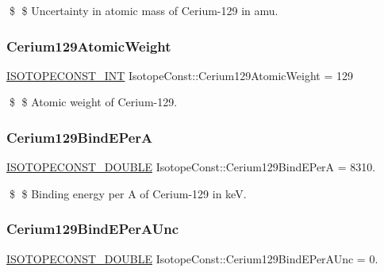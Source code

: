 \$ \$ Uncertainty in atomic mass of Cerium-\/129 in amu. \mbox{\label{group___isotope_const-_cerium-_ce129_ga8aa462ec2c97b78303dde9a27692f708}} 
\subsubsection{\texorpdfstring{Cerium129\+Atomic\+Weight}{Cerium129AtomicWeight}}
{\footnotesize\ttfamily \mbox{\hyperlink{group___isotope_const-_macros_ga5f18360b3e99483a35c32d789e62621c}{I\+S\+O\+T\+O\+P\+E\+C\+O\+N\+S\+T\+\_\+\+I\+NT}} Isotope\+Const\+::\+Cerium129\+Atomic\+Weight = 129}

\$ \$ Atomic weight of Cerium-\/129. \mbox{\label{group___isotope_const-_cerium-_ce129_ga03da9232ce08668b4e27d990b9cae39d}} 
\subsubsection{\texorpdfstring{Cerium129\+Bind\+E\+PerA}{Cerium129BindEPerA}}
{\footnotesize\ttfamily \mbox{\hyperlink{group___isotope_const-_macros_ga8f45a7272ce02c0b4c65c44636ed719a}{I\+S\+O\+T\+O\+P\+E\+C\+O\+N\+S\+T\+\_\+\+D\+O\+U\+B\+LE}} Isotope\+Const\+::\+Cerium129\+Bind\+E\+PerA = 8310.}

\$ \$ Binding energy per A of Cerium-\/129 in keV. \mbox{\label{group___isotope_const-_cerium-_ce129_gad65ee14b4a590990c210962ada8b0fa1}} 
\subsubsection{\texorpdfstring{Cerium129\+Bind\+E\+Per\+A\+Unc}{Cerium129BindEPerAUnc}}
{\footnotesize\ttfamily \mbox{\hyperlink{group___isotope_const-_macros_ga8f45a7272ce02c0b4c65c44636ed719a}{I\+S\+O\+T\+O\+P\+E\+C\+O\+N\+S\+T\+\_\+\+D\+O\+U\+B\+LE}} Isotope\+Const\+::\+Cerium129\+Bind\+E\+Per\+A\+Unc = 0.}

